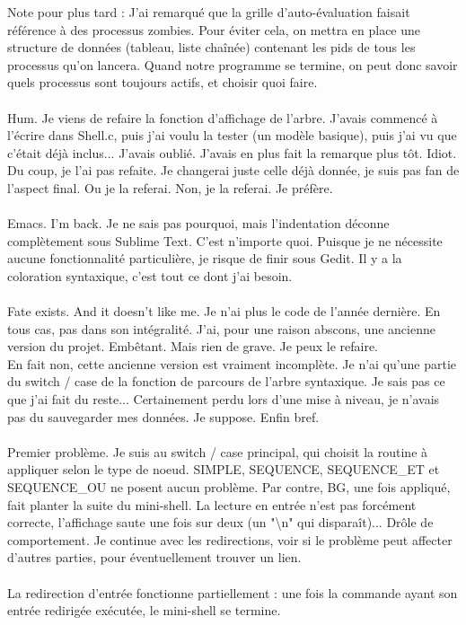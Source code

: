 Note pour plus tard : J'ai remarqué que la grille d'auto-évaluation faisait référence à des processus zombies. Pour éviter cela, on mettra en place une structure de données (tableau, liste chaînée) contenant les pids de tous les processus qu'on lancera. Quand notre programme se termine, on peut donc savoir quels processus sont toujours actifs, et choisir  quoi faire.
\\\\
Hum. Je viens de refaire la fonction d'affichage de l'arbre. J'avais commencé à l'écrire dans Shell.c, puis j'ai voulu la tester (un modèle basique), puis j'ai vu que c'était déjà inclus... J'avais oublié. J'avais en plus fait la remarque plus tôt. Idiot. Du coup, je l'ai pas refaite. Je changerai juste celle déjà donnée, je suis pas fan de l'aspect final. Ou je la referai. Non, je la referai. Je préfère.
\\\\
Emacs. I'm back. Je ne sais pas pourquoi, mais l'indentation déconne complètement sous Sublime Text. C'est n'importe quoi. Puisque je ne nécessite aucune fonctionnalité particulière, je risque de finir sous Gedit. Il y a la coloration syntaxique, c'est tout ce dont j'ai besoin.
\\\\
Fate exists. And it doesn't like me. Je n'ai plus le code de l'année dernière. En tous cas, pas dans son intégralité. J'ai, pour une raison abscons, une ancienne version du projet. Embêtant. Mais rien de grave. Je peux le refaire.
\\En fait non, cette ancienne version est vraiment incomplète. Je n'ai qu'une partie du switch / case de la fonction de parcours de l'arbre syntaxique. Je sais pas ce que j'ai fait du reste... Certainement perdu lors d'une mise à niveau, je n'avais pas du sauvegarder mes données. Je suppose. Enfin bref.
\\\\
Premier problème. Je suis au switch / case principal, qui choisit la routine à appliquer selon le type de noeud. SIMPLE, SEQUENCE, SEQUENCE\_ET et SEQUENCE\_OU ne posent aucun problème. Par contre, BG, une fois appliqué, fait planter la suite du mini-shell. La lecture en entrée n'est pas forcément correcte, l'affichage saute une fois sur deux (un "\textbackslash{n}" qui disparaît)... Drôle de comportement. Je continue avec les redirections, voir si le problème peut affecter d'autres parties, pour éventuellement trouver un lien.
\\\\
La redirection d'entrée fonctionne partiellement : une fois la commande ayant son entrée redirigée exécutée, le mini-shell se termine.
